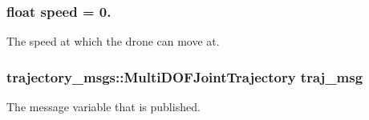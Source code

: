 \subsubsection[{\texorpdfstring{speed}{speed}}]{\setlength{\rightskip}{0pt plus 5cm}float speed = 0.}\hypertarget{oculus-control-alternative_8cpp_a7f7e4724cf57d59513b39c5ecc81adc8}{}\label{oculus-control-alternative_8cpp_a7f7e4724cf57d59513b39c5ecc81adc8}


The speed at which the drone can move at. 

\subsubsection[{\texorpdfstring{traj\+\_\+msg}{traj_msg}}]{\setlength{\rightskip}{0pt plus 5cm}trajectory\+\_\+msgs\+::\+Multi\+D\+O\+F\+Joint\+Trajectory traj\+\_\+msg}\hypertarget{oculus-control-alternative_8cpp_a090c0766fbb77862dd8cc0cca99d688b}{}\label{oculus-control-alternative_8cpp_a090c0766fbb77862dd8cc0cca99d688b}


The message variable that is published. 

